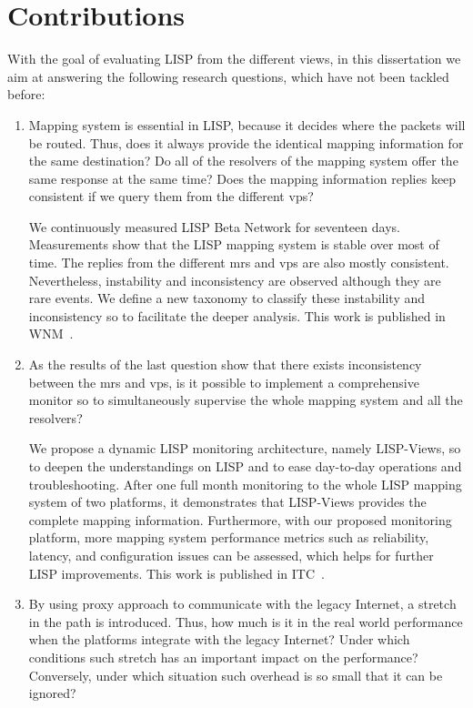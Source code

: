 \section{Contributions}
\label{sec:intro_contributions}
With the goal of evaluating LISP from the different views, in this dissertation we aim at answering the following research questions, which have not been tackled before:
\begin{enumerate}[noitemsep,topsep=0pt]
	\item Mapping system is essential in LISP, because it decides where the packets will be routed. Thus, does it always provide the identical mapping information for the same destination? Do all of the resolvers of the mapping system offer the same response at the same time? Does the mapping information replies keep consistent if we query them from the different \acrfull{vp}s?
	
	We continuously measured LISP Beta Network for seventeen days. Measurements show that the LISP mapping system is stable over most of time. The replies from the different \acrshort{mr}s and \acrshort{vp}s are also mostly consistent. Nevertheless, instability and inconsistency are observed although they are rare events. We define a new taxonomy to classify these instability and inconsistency so to facilitate the deeper analysis. This work is published in WNM~\cite{yue2016stability}.
	
	\item As the results of the last question show that there exists inconsistency between the \acrshort{mr}s and \acrshort{vp}s, is it possible to implement a comprehensive monitor so to simultaneously supervise the whole mapping system and all the resolvers?
	
	We propose a dynamic LISP monitoring architecture, namely LISP-Views, so to deepen the understandings on LISP and to ease day-to-day operations and troubleshooting. After one full month monitoring to the whole LISP mapping system of two platforms, it demonstrates that LISP-Views provides %
	the complete mapping information. Furthermore, with our proposed monitoring platform, more mapping system performance metrics such as reliability, latency, and configuration issues can be assessed, which helps for further LISP improvements. This work is published in ITC~\cite{li2017lisp}.
	
	\item By using proxy approach to communicate with the legacy Internet, a stretch in the path is introduced. Thus, how much is it in the real world performance when the platforms integrate with the legacy Internet? Under which conditions such stretch has an important impact on the performance? Conversely, under which situation such overhead is so small that it can be ignored? 
	

\end{enumerate}
